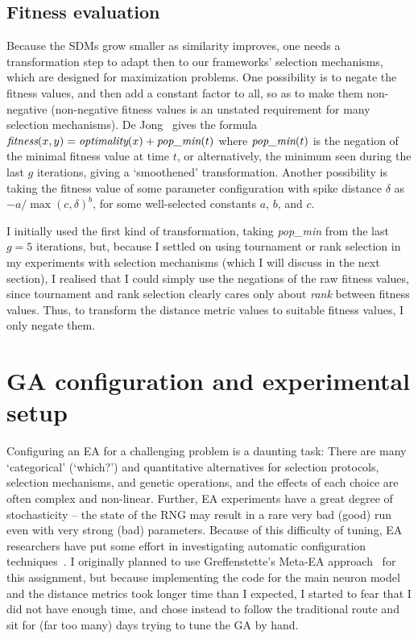 \documentclass[a4paper,9pt]{article}
\newcommand{\tightit}{\vspace{-5pt}}
\begin{document}
\subsection{Fitness evaluation}
Because the SDMs grow smaller as similarity improves, one
needs a transformation step to adapt then to our frameworks' selection
mechanisms, which are designed for maximization problems. One possibility is
to negate the fitness values, and then add a constant factor to all, so as to
make them non-negative (non-negative fitness values is an unstated requirement
for many selection mechanisms). De Jong~\cite{dejong} gives the
formula
$
\emph{fitness}(x, y) = \emph{optimality}(x) + \emph{pop\_min}(t)
$
where $\emph{pop\_min}(t)$ is the negation of the minimal fitness value at
time $t$, or alternatively, the minimum seen during the last $g$ iterations,
giving a `smoothened' transformation. 
Another possibility is taking the fitness value of some parameter configuration
with spike distance $\delta$ as $-a/\max(c, \delta)^b$, for some
well-selected constants $a$, $b$, and $c$. 

I initially used the first kind of transformation, taking \emph{pop\_min} from
the last $g=5$ iterations, but, because I settled on using tournament or rank
selection in my experiments with selection mechanisms (which I will discuss in
the next section), I realised that I could simply use the negations of the raw
fitness values, since tournament and rank selection clearly cares only about
\emph{rank} between fitness values. Thus, to transform the distance metric
values to suitable fitness values, I only negate them. 

\section{GA configuration and experimental setup}
\tightit \label{sec:experimentalsetup}
Configuring an EA for a challenging problem is a daunting task: There are many
`categorical' (`which?') and quantitative alternatives for selection
protocols, selection mechanisms, and genetic operations, and the effects of
each choice are often complex and non-linear. Further, EA experiments have a
great degree of stochasticity -- the state of the RNG may result in a rare
very bad (good) run even with very strong (bad) parameters.  Because of this
difficulty of tuning, EA researchers have put some effort in investigating
automatic configuration techniques~\cite{autoparam}.  I originally planned to
use Greffenstette's Meta-EA approach~\cite{metaea} for this
assignment, but because
implementing the code for the main neuron model and the distance metrics took
longer time than I expected, I started to fear that I did not have
enough time, and chose instead to follow the traditional route and sit for (far
too many) days trying to tune the GA by hand.
\end{document}
